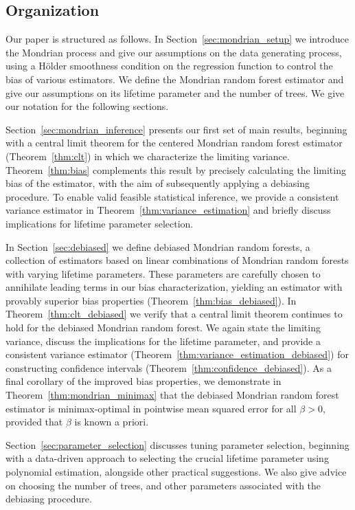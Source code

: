\subsection{Organization}

Our paper is structured as follows.
In Section~\ref{sec:mondrian_setup} we introduce the Mondrian process and give
our
assumptions on the data generating process,
using a H{\"o}lder smoothness condition on the regression function
to control the bias of various estimators.
We define the Mondrian random forest estimator and give our assumptions
on its lifetime parameter and the number of trees.
We give our notation for the following sections.

Section~\ref{sec:mondrian_inference} presents our first set of main results,
beginning with a central limit theorem for the centered Mondrian
random forest estimator (Theorem~\ref{thm:clt}) in which we
characterize the limiting variance.
Theorem~\ref{thm:bias} complements this result by
precisely calculating the limiting bias of the estimator,
with the aim of subsequently applying a debiasing procedure.
To enable valid feasible statistical inference,
we provide a consistent variance estimator
in Theorem~\ref{thm:variance_estimation}
and briefly discuss implications for lifetime parameter selection.

In Section~\ref{sec:debiased} we define debiased Mondrian random forests,
a collection of estimators
based on linear combinations of Mondrian random forests
with varying lifetime parameters.
These parameters are carefully chosen to annihilate leading terms
in our bias characterization,
yielding an estimator with provably superior bias properties
(Theorem~\ref{thm:bias_debiased}).
In Theorem~\ref{thm:clt_debiased} we verify that a central limit theorem
continues to hold for the debiased Mondrian random forest.
We again state the limiting variance,
discuss the implications for the lifetime parameter, and provide
a consistent variance estimator
(Theorem~\ref{thm:variance_estimation_debiased})
for constructing confidence intervals
(Theorem~\ref{thm:confidence_debiased}).
As a final corollary of the improved bias properties,
we demonstrate in Theorem~\ref{thm:mondrian_minimax} that the debiased Mondrian
random forest estimator is minimax-optimal in pointwise mean squared error
for all $\beta > 0$, provided that $\beta$ is known a priori.

Section~\ref{sec:parameter_selection} discusses tuning
parameter selection, beginning with a data-driven approach to
selecting the crucial lifetime parameter using polynomial estimation,
alongside other practical suggestions.
We also give advice on choosing the number of trees,
and other parameters associated with the debiasing procedure.


